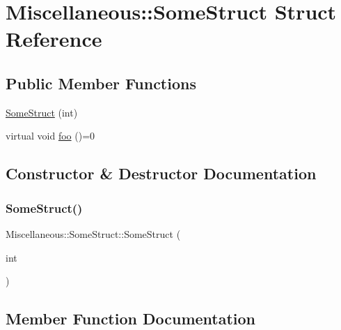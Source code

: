 \hypertarget{structMiscellaneous_1_1SomeStruct}{}\section{Miscellaneous\+::Some\+Struct Struct Reference}
\label{structMiscellaneous_1_1SomeStruct}
\subsection*{Public Member Functions}
\begin{DoxyCompactItemize}
\item 
\mbox{\hyperlink{structMiscellaneous_1_1SomeStruct_a686ed69179ef8afb9b7570cd623edb78}{Some\+Struct}} (int)
\item 
virtual void \mbox{\hyperlink{structMiscellaneous_1_1SomeStruct_a8dd485e81d18a6cb7629951060833597}{foo}} ()=0
\end{DoxyCompactItemize}


\subsection{Constructor \& Destructor Documentation}
\mbox{\label{structMiscellaneous_1_1SomeStruct_a686ed69179ef8afb9b7570cd623edb78}} 
\subsubsection{\texorpdfstring{SomeStruct()}{SomeStruct()}}
{\footnotesize\ttfamily Miscellaneous\+::\+Some\+Struct\+::\+Some\+Struct (\begin{DoxyParamCaption}\item[{int}]{ }\end{DoxyParamCaption})\hspace{0.3cm}{\ttfamily [inline]}}



\subsection{Member Function Documentation}
\mbox{\label{structMiscellaneous_1_1SomeStruct_a8dd485e81d18a6cb7629951060833597}} 
